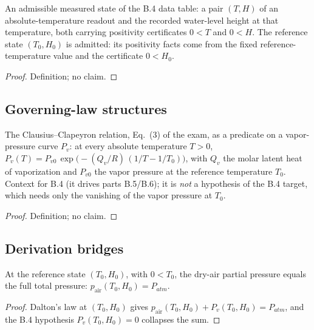 \begin{definition}
\label{def:IPhO2026Problems_problem_IPhO_2026_4_B_4:MeasuredState}
An admissible measured state of the B.4 data table: a pair $(T, H)$ of an
absolute-temperature readout and the recorded water-level height at that
temperature, both carrying positivity certificates $0 < T$ and $0 < H$.
The reference state $(T_0, H_0)$ is admitted: its positivity facts come
from the fixed reference-temperature value and the certificate
$0 < H_0$.
\end{definition}
\begin{proof}
Definition; no claim.
\end{proof}

\subsection*{Governing-law structures}

\begin{definition}
\label{def:IPhO2026Problems_problem_IPhO_2026_4_B_4:ClausiusClapeyron}
The Clausius--Clapeyron relation, Eq.\ (3) of the exam, as a predicate on
a vapor-pressure curve $P_v$: at every absolute temperature $T > 0$,
$P_v(T) = P_{v0}\,\exp\bigl(-(Q_v/R)\,(1/T - 1/T_0)\bigr)$, with $Q_v$
the molar latent heat of vaporization and $P_{v0}$ the vapor pressure at
the reference temperature $T_0$.  Context for B.4 (it drives parts
B.5/B.6); it is \emph{not} a hypothesis of the B.4 target, which needs
only the vanishing of the vapor pressure at $T_0$.
\end{definition}
\begin{proof}
Definition; no claim.
\end{proof}

\subsection*{Derivation bridges}

\begin{lemma}
\label{lem:IPhO2026Problems_problem_IPhO_2026_4_B_4:dryAirPartialPressure_at_T0}
At the reference state $(T_0, H_0)$, with $0 < T_0$, the dry-air partial
pressure equals the full total pressure:
$p_{\mathrm{air}}(T_0, H_0) = P_{atm}$.
\end{lemma}
\begin{proof}
Dalton's law at $(T_0, H_0)$ gives
$p_{\mathrm{air}}(T_0, H_0) + P_v(T_0, H_0) = P_{atm}$, and the B.4
hypothesis $P_v(T_0, H_0) = 0$ collapses the sum.
\end{proof}

